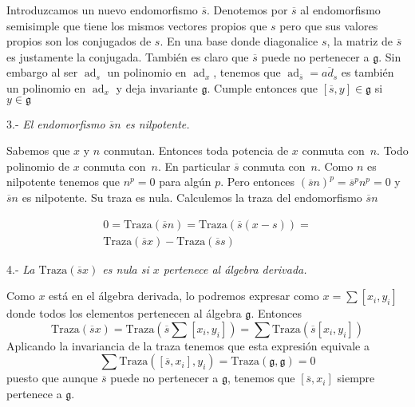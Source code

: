 \documentclass[a4paper,draft,12pt]{article}
\newcommand{\g}{\mathfrak{g}}%
\DeclareMathOperator{\ad}{ad}  %
\begin{document}
 Introduzcamos un nuevo endomorfismo $\overline{s}$.  Denotemos por $\overline{s}$ al endomorfismo semisimple que tiene los mismos vectores propios que $s$ pero que sus valores propios son los conjugados de $s$.  En una base donde diagonalice $s$, la matriz de $\overline{s}$ es justamente la conjugada.  También es claro que $\overline{s}$ puede no pertenecer a $\g$.  Sin embargo al ser $\ad_s$ un polinomio en $\ad_x$, tenemos que $\ad_{\overline{s}}= \overline{ad_s}$ es también un polinomio en $\ad_x$ y deja invariante $\g$.  Cumple entonces que $[\overline{s},y]\in \g$ si $y\in \g$
 
 \bigskip
 
 3.- \textit{El endomorfismo $\overline{s}n$ es nilpotente.}
 

   
  Sabemos que $x$ y $n$ conmutan.  Entonces toda potencia de $x$ conmuta con~$n$.  Todo polinomio de $x$ conmuta con~$n$. En particular $\overline{s}$ conmuta con~$n$.  Como $n$ es nilpotente tenemos que $n^p=0$ para algún $p$.  Pero entonces $(\overline{s}n)^p = \overline{s}^pn^p=0$ y $\overline{s}n$ es nilpotente. Su traza es nula.  Calculemos la traza del endomorfismo $\overline{s}n$
  
  
  
\begin{equation}\nonumber
\begin{split}
 0=\mathrm{Traza}(\overline{s}n) = \mathrm{Traza}(\overline{s}(x-s))= \\
 \mathrm{Traza}(\overline{s}x) -\mathrm{Traza}(\overline{s}s) 
  \end{split}
  \end{equation}
  
  \bigskip
  
  4.- \textit{La  $\mathrm{Traza}(\overline{s}x)$ es nula si $x$ pertenece al álgebra derivada.}
  
    Como $x$ está en el álgebra derivada, lo podremos expresar como $x = \sum [x_i,y_i]$ donde todos los elementos pertenecen al álgebra $\g$.  Entonces
 $$
\textstyle \mathrm{Traza}(\overline{s}x) = \mathrm{Traza}(\overline{s}\sum[x_i,y_i]) = \sum\mathrm{Traza}(\overline{s}[x_i,y_i])
 $$
 Aplicando la invariancia de la traza tenemos que esta expresión equivale a 
 $$
 \textstyle \sum\mathrm{Traza}([\overline{s},x_i], y_i)= \mathrm{Traza}(\g,\g)=0
 $$
 puesto que aunque $\overline{s}$ puede no pertenecer a $\g$, tenemos que $[\overline{s},x_i]$ siempre pertenece a $\g$.
 
 \bigskip
 
\end{document}
